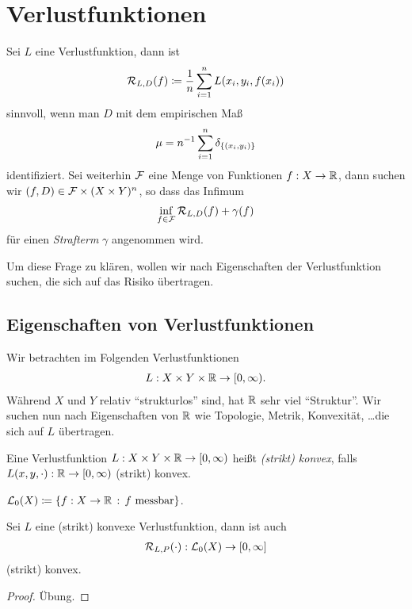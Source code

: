 \chapter{Verlustfunktionen}
\newcommand{\hinge}{\mathrm{hinge}}

Sei $L$ eine Verlustfunktion, dann ist
\begin{align*}
\mathcal{R}_{L,D}(f) \coloneq \frac{1}{n}\sum_{i=1}^n L(x_i,y_i,f(x_i))
\end{align*} 
sinnvoll, wenn man $D$ mit dem empirischen Maß
\begin{align*}
\mu=n^{-1} \sum_{i=1}^n \delta_{\left\{ (x_i,y_i) \right\}}
\end{align*}
identifiziert. Sei weiterhin $\mathcal{F}$ eine Menge von Funktionen $f: X\to \mathbb{R}$, dann
suchen wir $(f,D)\in \mathcal{F}\times (X\times Y)^n$, so dass das Infimum
\begin{align*}
\inf_{f\in\mathcal{F}} \mathcal{R}_{L,D}(f)+\gamma(f)
\end{align*}
für einen \emph{Strafterm} $\gamma$ angenommen wird.

Um diese Frage zu klären, wollen wir nach Eigenschaften der Verlustfunktion
suchen, die sich auf das Risiko übertragen.

\section{Eigenschaften von Verlustfunktionen}

Wir betrachten im Folgenden Verlustfunktionen
\begin{align*}
L : X\times Y \times \mathbb{R} \to [0,\infty).
\end{align*}
Während $X$ und $Y$ relativ ``strukturlos'' sind, hat $\mathbb{R}$ sehr viel
``Struktur''. Wir suchen nun nach Eigenschaften von $\mathbb{R}$ wie
Topologie, Metrik, Konvexität, \ldots die sich auf $L$ übertragen.

\begin{defn}
\label{defn:2.1.1}
Eine Verlustfunktion $L:X\times Y\times \mathbb{R}\to [0,\infty)$ heißt \emph{(strikt)
konvex}, falls $L(x,y,\cdot):\mathbb{R}\to[0,\infty)$
(strikt) konvex.\fishhere
\end{defn}

\begin{bem*}[Erinnerung.]
$\mathcal{L}_0(X) \coloneq \left\{ f: X\to\mathbb{R}\,:\,f\text{ messbar}\right\}$.\maphere
\end{bem*}

\begin{lem}
\label{prop:2.1.2}
Sei $L$ eine (strikt) konvexe Verlustfunktion, dann ist auch
\begin{align*}
\mathcal{R}_{L,P}(\cdot) : \mathcal{L}_0(X)\to [0,\infty]
\end{align*}
(strikt) konvex.\fishhere
\end{lem}
\begin{proof}
Übung.\qedhere
\end{proof}


